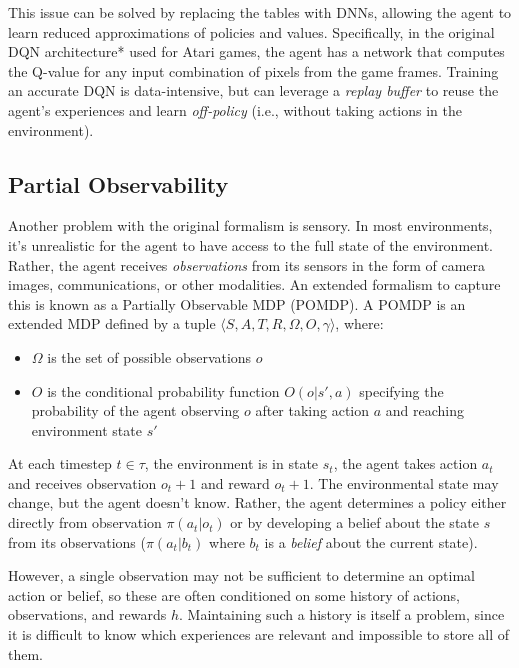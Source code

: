 \documentclass[letterpaper]{article}
\begin{document}
 	This issue can be solved by replacing the tables with DNNs, allowing the agent to learn reduced approximations of policies and values. Specifically, in the original DQN architecture* used for Atari games, the agent has a network that computes the Q-value for any input combination of pixels from the game frames. Training an accurate DQN is data-intensive, but can leverage a \textit{replay buffer} to reuse the agent's experiences and learn \textit{off-policy} (i.e., without taking actions in the environment).
 	
 	\subsection{Partial Observability}
 	
 	Another problem with the original formalism is sensory. In most environments, it's unrealistic for the agent to have access to the full state of the environment. Rather, the agent receives \textit{observations} from its sensors in the form of camera images, communications, or other modalities. An extended formalism to capture this is known as a Partially Observable MDP (POMDP). A POMDP is an extended MDP defined by a tuple $\langle S, A, T, R, \Omega, O, \gamma \rangle$, where:
 	\begin{itemize}
 		\item $\Omega$ is the set of possible observations $o$
 		\item $O$ is the conditional probability function $O(o|s',a)$ specifying the probability of the agent observing $o$ after taking action $a$ and reaching environment state $s'$
 	\end{itemize}
 
 	At each timestep $t\in \tau$, the environment is in state $s_t$, the agent takes action $a_t$ and receives observation $o_t+1$ and reward $o_t+1$. The environmental state may change, but the agent doesn't know. Rather, the agent determines a policy either directly from observation $\pi(a_t|o_t)$ or by developing a belief about the state $s$ from its observations ($\pi(a_t|b_t)$ where $b_t$ is a \textit{belief} about the current state). 
 	
 	However, a single observation may not be sufficient to determine an optimal action or belief, so these are often conditioned on some history of actions, observations, and rewards $h$. Maintaining such a history is itself a problem, since it is difficult to know which experiences are relevant and impossible to store all of them.
 	
\end{document}
